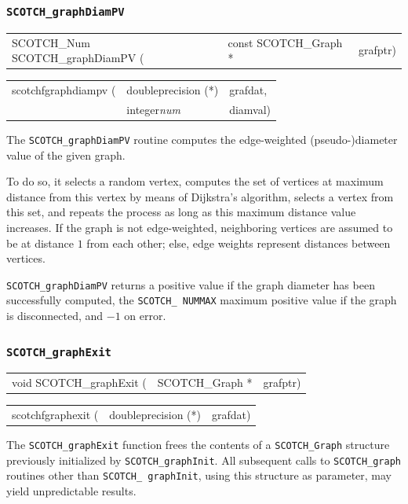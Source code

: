 \subsubsection{{\tt SCOTCH\_graphDiamPV}}

\begin{itemize}
\progsyn

{\tt\begin{tabular}{l@{}ll}
SCOTCH\_Num SCOTCH\_graphDiamPV ( & const SCOTCH\_Graph * & grafptr)
\end{tabular}}

{\tt\begin{tabular}{l@{}ll}
scotchfgraphdiampv ( & doubleprecision (*) & grafdat, \\
                     & integer{\it num}    & diamval)

\end{tabular}}

\progdes

The {\tt SCOTCH\_graphDiamPV} routine computes the edge-weighted
(pseudo-)diameter value of the given graph.

To do so, it selects a random vertex, computes the set of vertices at
maximum distance from this vertex by means of Dijkstra's algorithm,
selects a vertex from this set, and repeats the process as long as
this maximum distance value increases. If the graph is not
edge-weighted, neighboring vertices are assumed to be at distance $1$
from each other; else, edge weights represent distances between
vertices.

\progret

{\tt SCOTCH\_graphDiamPV} returns a positive value if the graph
diameter has been successfully computed, the \texttt{SCOTCH\_\lbt
NUMMAX} maximum positive value if the graph is disconnected, and $-1$
on error.
\end{itemize}

\subsubsection{{\tt SCOTCH\_graphExit}}

\begin{itemize}
\progsyn

{\tt\begin{tabular}{l@{}ll}
void SCOTCH\_graphExit ( & SCOTCH\_Graph * & grafptr)
\end{tabular}}

{\tt\begin{tabular}{l@{}ll}
scotchfgraphexit ( & doubleprecision (*) & grafdat)
\end{tabular}}

\progdes

The {\tt SCOTCH\_graphExit} function frees the contents of a
{\tt SCOTCH\_\lbt Graph} structure previously initialized by
{\tt SCOTCH\_\lbt graphInit}. All subsequent calls to
{\tt SCOTCH\_\lbt graph} routines other than {\tt SCOTCH\_\lbt
graphInit}, using this structure as parameter, may yield
unpredictable results.
\end{itemize}

